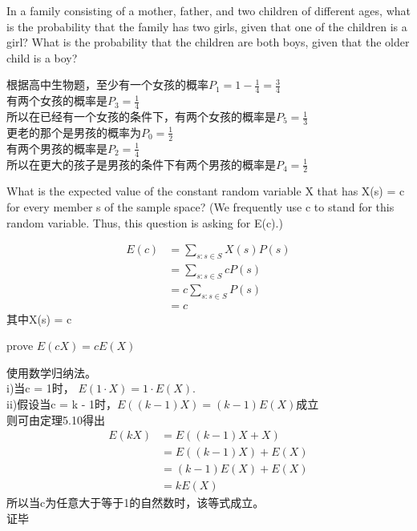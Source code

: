 \documentclass[a4paper, justified]{tufte-handout}
\begin{document}
\begin{problem}[CS 5.3-12]
In a family consisting of a mother, father, and two children of different ages, what is the probability that the family has two girls, given that one of the children is a girl? What is the probability that the children are both boys, given that the older child is a boy?
\end{problem}

\begin{solution}
  根据高中生物题，至少有一个女孩的概率$P_1 = 1 - \frac{1}{4} = \frac{3}{4}$\\
  有两个女孩的概率是$P_3 = \frac{1}{4}$\\
  所以在已经有一个女孩的条件下，有两个女孩的概率是$P_5 = \frac{1}{3}$\\
  更老的那个是男孩的概率为$P_0 = \frac{1}{2}$\\
  有两个男孩的概率是$P_2 = \frac{1}{4}$\\
  所以在更大的孩子是男孩的条件下有两个男孩的概率是$P_4 = \frac{1}{2}$
\end{solution}

\begin{problem}[CS 5.4-10]
What is the expected value of the constant random variable X that has X(s) = c for every member s of the sample space? (We frequently use c to stand for this random variable. Thus, this question is asking for E(c).)
\end{problem}

\begin{solution}
  $$
    \begin{aligned}
      E(c) & = \sum_{s:s\in S}X(s)P(s) \\
           & =\sum_{s:s\in S}cP(s)     \\
           & =c\sum_{s:s\in S}P(s)     \\
           & =c
    \end{aligned}
  $$
  其中X(s) = c
\end{solution}

\begin{problem}[CS 5.4-15]
prove $E(cX) = cE(X)$
\end{problem}

\begin{solution}
  使用数学归纳法。\\
  i)当c = 1时， $E(1\cdot X) = 1\cdot E(X)$.\\
  ii)假设当c = k - 1时，$E((k-1)X) = (k-1)E(X)$成立\\
  则可由定理5.10得出\\
  $$
    \begin{aligned}
      E(kX) & = E((k-1)X + X)    \\
            & = E((k-1)X) + E(X) \\
            & = (k-1)E(X) + E(X) \\
            & =kE(X)
    \end{aligned}
  $$
  所以当c为任意大于等于1的自然数时，该等式成立。\\
  证毕

\end{solution}
\end{document}
